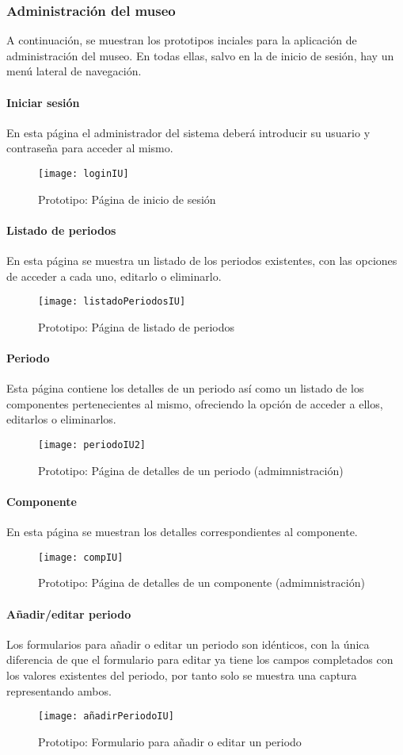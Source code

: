 \subsubsection{Administración del museo}
A continuación, se muestran los prototipos inciales para la aplicación de administración del museo. En todas ellas, salvo en la de inicio de sesión, hay un menú lateral de navegación. 
\paragraph*{Iniciar sesión}
En esta página el administrador del sistema deberá introducir su usuario y contraseña para acceder al mismo.
\begin{figure}[H]
\centering
\texttt{[image: loginIU]}
\caption{Prototipo: Página de inicio de sesión}\label{iu:login}
\end{figure}
\paragraph*{Listado de periodos}
En esta página se muestra un listado de los periodos existentes, con las opciones de acceder a cada uno, editarlo o eliminarlo.
\begin{figure}[H]
\centering
\texttt{[image: listadoPeriodosIU]}
\caption{Prototipo: Página de listado de periodos}\label{iu:list-periods}
\end{figure}
\paragraph*{Periodo}
Esta página contiene los detalles de un periodo así como un listado de los componentes pertenecientes al mismo, ofreciendo la opción de acceder a ellos, editarlos o eliminarlos.
\begin{figure}[H]
\centering
\texttt{[image: periodoIU2]}
\caption{Prototipo: Página de detalles de un periodo (admimnistración)}\label{iu:period}
\end{figure}
\paragraph*{Componente}
En esta página se muestran los detalles correspondientes al componente.
\begin{figure}[H]
\centering
\texttt{[image: compIU]}
\caption{Prototipo: Página de detalles de un componente (admimnistración)}\label{iu:my-comp}
\end{figure}
\paragraph*{Añadir/editar periodo}
Los formularios para añadir o editar un periodo son idénticos, con la única diferencia de que el formulario para editar ya tiene los campos completados con los valores existentes del periodo, por tanto solo se muestra una captura representando ambos.
\begin{figure}[H]
\centering
\texttt{[image: añadirPeriodoIU]}
\caption{Prototipo: Formulario para añadir o editar un periodo}\label{iu:add-period}
\end{figure}
